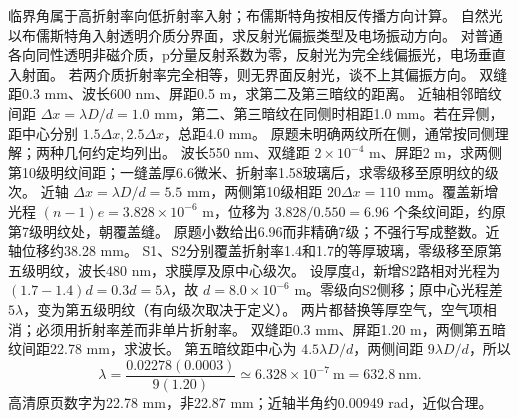\crosscheck 临界角属于高折射率向低折射率入射；布儒斯特角按相反传播方向计算。
\problemtext 自然光以布儒斯特角入射透明介质分界面，求反射光偏振类型及电场振动方向。
\workings 对普通各向同性透明非磁介质，p分量反射系数为零，反射光为完全线偏振光，电场垂直入射面。
\crosscheck 若两介质折射率完全相等，则无界面反射光，谈不上其偏振方向。
\problemtext 双缝距0.3 mm、波长600 nm、屏距0.5 m，求第二及第三暗纹的距离。
\workings 近轴相邻暗纹间距 $\Delta x=\lambda D/d=1.0$ mm，第二、第三暗纹在同侧时相距1.0 mm。若在异侧，距中心分别 $1.5\Delta x,2.5\Delta x$，总距4.0 mm。
\crosscheck 原题未明确两纹所在侧，通常按同侧理解；两种几何约定均列出。
\problemtext 波长550 nm、双缝距 $2\times10^{-4}$ m、屏距2 m，求两侧第10级明纹间距；一缝盖厚6.6微米、折射率1.58玻璃后，求零级移至原明纹的级次。
\workings 近轴 $\Delta x=\lambda D/d=5.5$ mm，两侧第10级相距 $20\Delta x=110$ mm。覆盖新增光程 $(n-1)e=3.828\times10^{-6}$ m，位移为 $3.828/0.550=6.96$ 个条纹间距，约原第7级明纹处，朝覆盖缝。
\crosscheck 原题小数给出6.96而非精确7级；不强行写成整数。近轴位移约38.28 mm。
\problemtext S1、S2分别覆盖折射率1.4和1.7的等厚玻璃，零级移至原第五级明纹，波长480 nm，求膜厚及原中心级次。
\workings 设厚度d，新增S2路相对光程为 $(1.7-1.4)d=0.3d=5\lambda$，故 $d=8.0\times10^{-6}$ m。零级向S2侧移；原中心光程差 $5\lambda$，变为第五级明纹（有向级次取决于定义）。
\crosscheck 两片都替换等厚空气，空气项相消；必须用折射率差而非单片折射率。
\problemtext 双缝距0.3 mm、屏距1.20 m，两侧第五暗纹间距22.78 mm，求波长。
\workings 第五暗纹距中心为 $4.5\lambda D/d$，两侧间距 $9\lambda D/d$，所以
\[
\lambda=\frac{0.02278(0.0003)}{9(1.20)}
\simeq6.328\times10^{-7}\ \mathrm m=632.8\ \mathrm{nm}.
\]
\crosscheck 高清原页数字为22.78 mm，非22.87 mm；近轴半角约0.00949 rad，近似合理。

